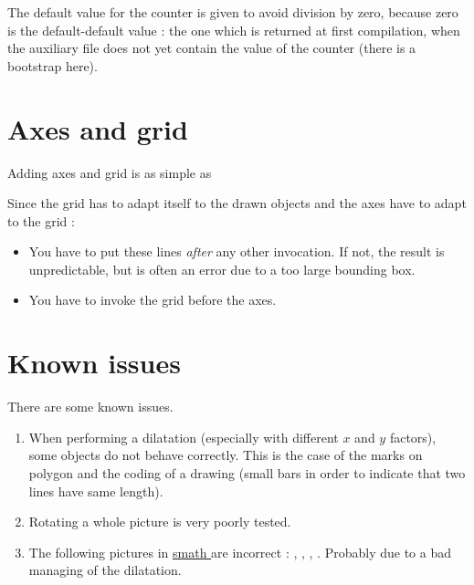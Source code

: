 \begin{example}
    
\begin{center}
   
\end{center}


\end{example}


The default value for the  counter is given to avoid division by zero, because zero is the default-default value : the one which is returned at first compilation, when the auxiliary file does not yet contain the value of the counter (there is a bootstrap here).

\section{Axes and grid}

Adding axes and grid is as simple as



Since the grid has to adapt itself to the drawn objects and the axes have to adapt to the grid :
\begin{itemize}
    \item You have to put these lines \emph{after} any other  invocation. If not, the result is unpredictable, but is often an error due to a too large bounding box.
    \item You have to invoke the grid before the axes.
\end{itemize}

\section{Known issues}

There are some known issues.
\begin{enumerate}
    \item
        When performing a dilatation (especially with different \( x\) and \( y\) factors), some objects do not behave correctly. This is the case of the marks on polygon and the coding of a drawing (small bars in order to indicate that two lines have same length).
    \item
        Rotating a whole picture is very poorly tested.
    \item The following pictures in \href{ http://laurent.claessens-donadello.eu/smath.pdf }{ smath } are incorrect :  ,  ,  ,  . Probably due to a bad managing of the dilatation.
\end{enumerate}
